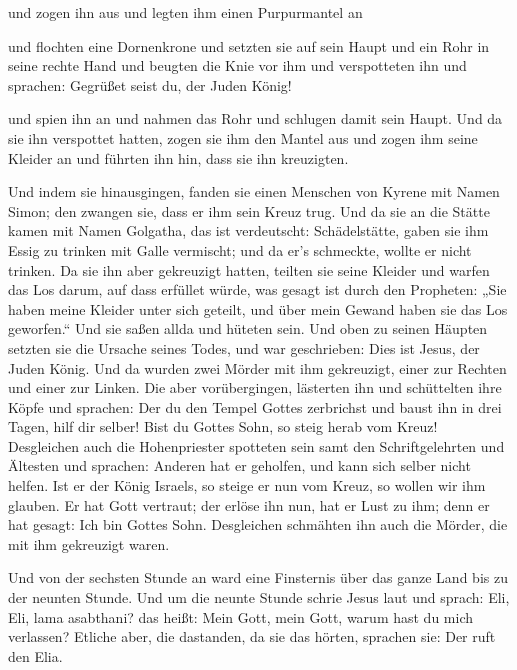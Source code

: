  und zogen ihn aus und legten ihm einen Purpurmantel an

 und flochten eine Dornenkrone und setzten sie auf sein
Haupt und ein Rohr in seine rechte Hand und beugten die Knie vor ihm und
verspotteten ihn und sprachen: Gegrüßet seist du, der Juden König!

 und spien ihn an und nahmen das Rohr und schlugen damit
sein Haupt.  Und da sie ihn verspottet hatten, zogen sie
ihm den Mantel aus und zogen ihm seine Kleider an und führten ihn hin,
dass sie ihn kreuzigten.

 Und indem sie hinausgingen, fanden sie einen Menschen
von Kyrene mit Namen Simon; den zwangen sie, dass er ihm sein Kreuz
trug.  Und da sie an die Stätte kamen mit Namen Golgatha,
das ist verdeutscht: Schädelstätte,  gaben sie ihm Essig
zu trinken mit Galle vermischt; und da er's schmeckte, wollte er nicht
trinken.  Da sie ihn aber gekreuzigt hatten, teilten sie
seine Kleider und warfen das Los darum, auf dass erfüllet würde, was
gesagt ist durch den Propheten: „Sie haben meine Kleider unter sich
geteilt, und über mein Gewand haben sie das Los geworfen.``
 Und sie saßen allda und hüteten sein. 
Und oben zu seinen Häupten setzten sie die Ursache seines Todes, und war
geschrieben: Dies ist Jesus, der Juden König.  Und da
wurden zwei Mörder mit ihm gekreuzigt, einer zur Rechten und einer zur
Linken.  Die aber vorübergingen, lästerten ihn und
schüttelten ihre Köpfe  und sprachen: Der du den Tempel
Gottes zerbrichst und baust ihn in drei Tagen, hilf dir selber! Bist du
Gottes Sohn, so steig herab vom Kreuz!  Desgleichen auch
die Hohenpriester spotteten sein samt den Schriftgelehrten und Ältesten
und sprachen:  Anderen hat er geholfen, und kann sich
selber nicht helfen. Ist er der König Israels, so steige er nun vom
Kreuz, so wollen wir ihm glauben.  Er hat Gott vertraut;
der erlöse ihn nun, hat er Lust zu ihm; denn er hat gesagt: Ich bin
Gottes Sohn.  Desgleichen schmähten ihn auch die Mörder,
die mit ihm gekreuzigt waren.

 Und von der sechsten Stunde an ward eine Finsternis über
das ganze Land bis zu der neunten Stunde.  Und um die
neunte Stunde schrie Jesus laut und sprach: Eli, Eli, lama asabthani?
das heißt: Mein Gott, mein Gott, warum hast du mich verlassen?
 Etliche aber, die dastanden, da sie das hörten, sprachen
sie: Der ruft den Elia.

